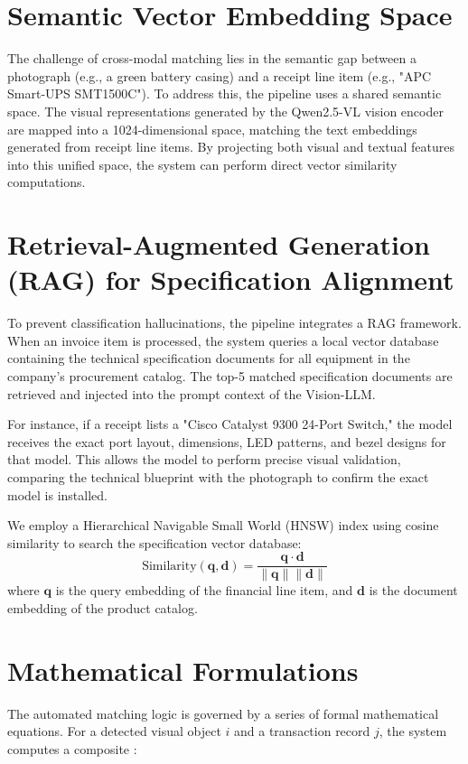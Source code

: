 \documentclass[11pt,letterpaper]{report}
\begin{document}
\section{Semantic Vector Embedding Space}

The challenge of cross-modal matching lies in the semantic gap between a photograph (e.g., a green battery casing) and a receipt line item (e.g., "APC Smart-UPS SMT1500C"). To address this, the pipeline uses a shared semantic space. The visual representations generated by the Qwen2.5-VL vision encoder are mapped into a 1024-dimensional space, matching the text embeddings generated from receipt line items. By projecting both visual and textual features into this unified space, the system can perform direct vector similarity computations.

\section{Retrieval-Augmented Generation (RAG) for Specification Alignment}

To prevent classification hallucinations, the pipeline integrates a RAG framework. When an invoice item is processed, the system queries a local vector database containing the technical specification documents for all equipment in the company's procurement catalog. The top-5 matched specification documents are retrieved and injected into the prompt context of the Vision-LLM. 

For instance, if a receipt lists a "Cisco Catalyst 9300 24-Port Switch," the model receives the exact port layout, dimensions, LED patterns, and bezel designs for that model. This allows the model to perform precise visual validation, comparing the technical blueprint with the photograph to confirm the exact model is installed.

We employ a Hierarchical Navigable Small World (HNSW) index using cosine similarity to search the specification vector database:
\[
\text{Similarity}(\mathbf{q}, \mathbf{d}) = \frac{\mathbf{q} \cdot \mathbf{d}}{\|\mathbf{q}\| \|\mathbf{d}\|}
\]
where $\mathbf{q}$ is the query embedding of the financial line item, and $\mathbf{d}$ is the document embedding of the product catalog.

\section{Mathematical Formulations}

The automated matching logic is governed by a series of formal mathematical equations. For a detected visual object $i$ and a transaction record $j$, the system computes a composite :
\end{document}

